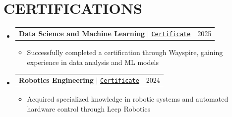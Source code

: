 \documentclass[letterpaper,11pt]{article}
\makeatletter
\newcommand{\resumeItem}[1]{
  \item\small{
    {#1 \vspace{-1pt}}
  }
}
\newcommand{\resumeProjectHeading}[2]{
    \item
    \begin{tabular*}{\textwidth}{l@{\extracolsep{\fill}}r}
      #1 & {\color{dark-grey}\small #2} \\
    \end{tabular*}\vspace{-4pt}
}
\newcommand{\resumeSubHeadingListStart}{\begin{itemize}[leftmargin=0in, label={}]}
\newcommand{\resumeSubHeadingListEnd}{\end{itemize}}
\newcommand{\resumeItemListStart}{\begin{itemize}}
\newcommand{\resumeItemListEnd}{\end{itemize}\vspace{0pt}}
\makeatother
\begin{document}
\section{CERTIFICATIONS}
  \resumeSubHeadingListStart
    \resumeProjectHeading
      {\textbf{Data Science and Machine Learning} $|$ \href{https://drive.google.com/file/d/1ojNacJw_IAs-HOwOdBvabn_E_qpf9Ex-/view?usp=sharing}{\texttt{Certificate}}}{2025}
      \resumeItemListStart
        \resumeItem{Successfully completed a certification through Wayspire, gaining experience in data analysis and ML models}
      \resumeItemListEnd
    \resumeProjectHeading
      {\textbf{Robotics Engineering} $|$ \href{https://drive.google.com/file/d/1BP6JeRO4wB5FMddfOM6MgqnnZnxRmiKm/view?usp=sharing}{\texttt{Certificate}}}{2024}
      \resumeItemListStart
        \resumeItem{Acquired specialized knowledge in robotic systems and automated hardware control through Leep Robotics}
      \resumeItemListEnd
  \resumeSubHeadingListEnd


\end{document}
